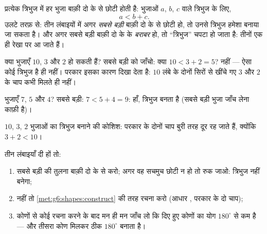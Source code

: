 \begin{theorem}[त्रिभुज असमिका]\label{thm:g7:triangles:inequality}
प्रत्येक त्रिभुज में हर भुजा बाक़ी दो के  से छोटी होती है:
भुजाओं $a$, $b$, $c$ वाले त्रिभुज के लिए,
\[
a < b + c .
\]
उलटे तरफ़ से: तीन लंबाइयों में अगर \emph{सबसे बड़ी} बाक़ी दो के
 से छोटी हो, तो उनसे त्रिभुज हमेशा बनाया जा सकता है। और अगर
सबसे बड़ी बाक़ी दो के  के \emph{बराबर} हो, तो ``त्रिभुज'' चपटा
हो जाता है: तीनों  एक ही रेखा पर आ जाते हैं।
\end{theorem}
\admitted

\begin{example}\label{ex:g7:triangles:inequality}
क्या भुजाएँ $10$, $3$ और $2$ हो सकती हैं? सबसे बड़ी को जाँचो: क्या
$10 < 3 + 2 = 5$? नहीं --- ऐसा कोई त्रिभुज है ही नहीं। परकार इसका
कारण दिखा देता है: $10$ लंबे  के दोनों सिरों से खींचे गए
$3$ और $2$  के चाप कभी मिलते ही नहीं।

भुजाएँ $7$, $5$ और $4$? सबसे बड़ी: $7 < 5 + 4 = 9$: हाँ, त्रिभुज
बनता है (सबसे बड़ी भुजा जाँच लेना काफ़ी है)।
\end{example}

\begin{omfigure}

{\small $10$, $3$, $2$ भुजाओं का त्रिभुज बनाने की कोशिश: परकार के
दोनों चाप बुरी तरह दूर रह जाते हैं, क्योंकि $3 + 2 < 10$।}
\end{omfigure}

\begin{method}\label{met:g7:triangles:construct}
तीन लंबाइयाँ दी हों तो:
\begin{enumerate}
  \item सबसे बड़ी की तुलना बाक़ी दो के  से करो; अगर वह
        सचमुच छोटी न हो तो रुक जाओ: त्रिभुज नहीं बनेगा;
  \item नहीं तो \cref{met:g6:shapes:construct} की तरह रचना करो
        (आधार , परकार के दो चाप);
  \item कोणों से कोई रचना करने के बाद मन ही मन जाँच लो कि दिए हुए
        कोणों का योग $180^\circ$ से कम है --- और तीसरा कोण मिलकर
        ठीक $180^\circ$ बनाता है।
\end{enumerate}
\end{method}

